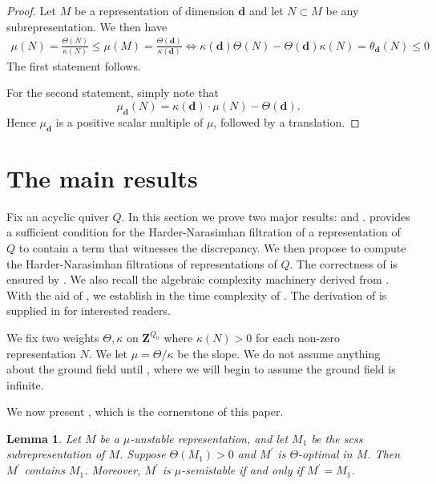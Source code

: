 \documentclass[a4paper]{amsart}
\numberwithin{equation}{section}
\theoremstyle{plain}
\newtheorem{lemma}[theorem]{Lemma}
\theoremstyle{definition}
\begin{document}
\begin{proof}
Let $M$ be a representation of dimension $\mathbf{d}$ and let $N\subset M$ be any subrepresentation. We then have 
\begin{equation*}
\begin{split}
    \mu(N)=\frac{\Theta(N)}{\kappa(N)}\leq \mu(M)=\frac{\Theta(\mathbf{d})}{\kappa(\mathbf{d})}\Leftrightarrow \kappa(\mathbf{d})\Theta(N)-\Theta(\mathbf{d})\kappa(N)=\theta_{\mathbf{d}}(N)\leq 0
    \end{split}
\end{equation*}
The first statement follows.

For the second statement, simply note that $$\mu_{\mathbf{d}}(N) = \kappa(\mathbf{d})\cdot \mu(N)-\Theta(\mathbf{d}).$$ Hence $\mu_{\mathbf{d}}$ is a positive scalar multiple of $\mu$, followed by a translation.
\end{proof}

\section{The main results}\label{the_main_results_main_body}
Fix an acyclic quiver $Q$. In this section we prove two major results:  and .  provides a sufficient condition for the Harder-Narasimhan filtration of a representation of $Q$ to contain a term that witnesses the discrepancy. We then propose   to compute the Harder-Narasimhan filtrations of representations of $Q$. The correctness of  is ensured by . We also recall the algebraic complexity machinery   derived from \cite{MR3868734}.  With the aid of , we establish in  the time complexity of . The derivation of  is supplied in  for interested readers.

We fix two weights $\Theta,\kappa$ on $\mathbf{Z}^{Q_0}$ where $\kappa(N)>0$ for each non-zero representation $N.$ We let $\mu=\Theta/\kappa$ be the slope. We do not assume anything about the ground field until , where we will begin to assume the ground field is infinite. 

We now present , which is the cornerstone of this paper. 

\begin{lemma}\label{discrep_contains_1st_HN_term}
Let $M$ be a $\mu$-unstable representation, and let $M_1$ be the scss subrepresentation of $M$. Suppose $\Theta(M_1)>0$ and $M^{\prime}$ is $\Theta$-optimal in $M$. Then $M^{\prime}$ contains $M_{1}$. Moreover, $M^{\prime}$ is $\mu$-semistable if and only if $M^{\prime}=M_1$.
\end{lemma}
\end{document}
